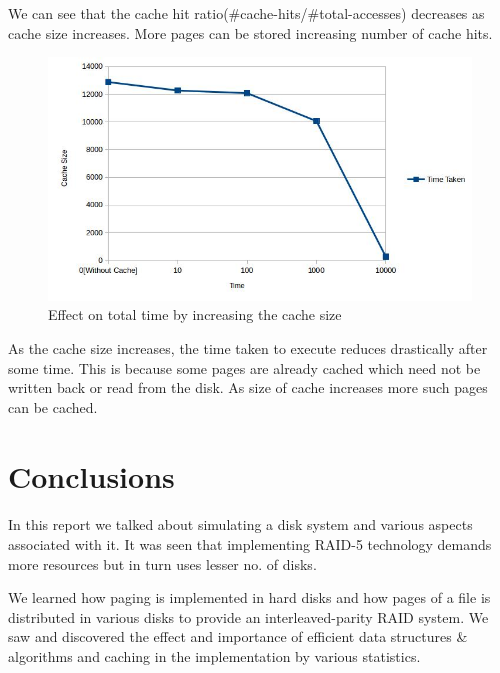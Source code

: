 \documentclass[11pt]{article}
\begin{document}
We can see that the cache hit ratio(\#cache-hits/\#total-accesses) decreases as cache size increases. More pages can be stored increasing number of cache hits.


\begin{figure}[ht!]
\center
\includegraphics[scale = 0.60]{images/cache2.png}
\caption{Effect on total time by increasing the cache size}
\label{overflow}
\end{figure}

As the cache size increases, the time taken to execute reduces drastically after some time. This is because some pages are already cached which need not be written back or read from the disk. As size of cache increases more such pages can be cached.

\section{Conclusions}
\paragraph{}
In this report we talked about simulating a disk system and various aspects associated with it. It was seen that implementing RAID-5 technology demands more resources but in turn uses lesser no. of disks.
 
We learned how paging is implemented in hard disks and how pages of a file is distributed in various disks to provide an interleaved-parity RAID system. We saw and discovered the effect and importance of efficient data structures \& algorithms and caching in the implementation by various statistics.
\end{document}
